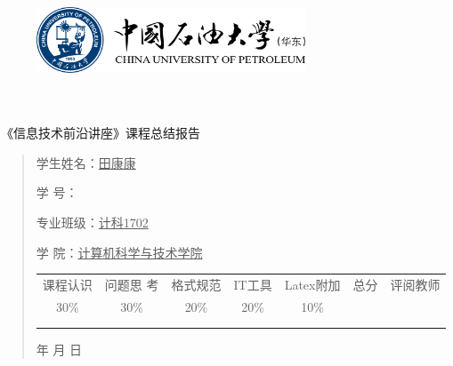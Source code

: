 \documentclass{article}
\renewcommand{\today}{\number\year 年 \number\month 月 \number\day 日}
\begin{document}
\begin{figure}
    \centering
    \includegraphics[width=8cm]{upc.png}

    \label{figupc}
\end{figure}

	\begin{center}
		\quad \\
		\quad \\
		\heiti \fontsize{45}{17} \quad \quad \quad 
		\vskip 1.5cm
		\heiti {} 《信息技术前沿讲座》课程总结报告
	\end{center}
	\vskip 2.0cm
		
	\begin{quotation}
		\doublespacing
		
        \par\setlength\parindent{7em}
		\quad 

		学生姓名：\underline{\qquad  田康康 \qquad \qquad}

		学\hspace{0.61cm} 号：\underline{\qquad}
		
		专业班级：\underline{\qquad 计科1702 \qquad  }
		
        学\hspace{0.61cm} 院：\underline{计算机科学与技术学院}
		\vskip 2cm
		\centering
		\begin{table}[h]
            \centering 
            \begin{tabular}{|c|c|c|c|c|c|c|}
                \hline
                课程认识 & 问题思 考 & 格式规范  & IT工具  & Latex附加  & 总分 & 评阅教师 \\
                30\% & 30\% & 20\% & 20\% & 10\% &  &  \\
                \hline
                 & & & & & &\\
                & & & & & &\\
                \hline
            \end{tabular}
        \end{table}
		\vskip 2cm
		\today
	\end{quotation}
\end{document}
